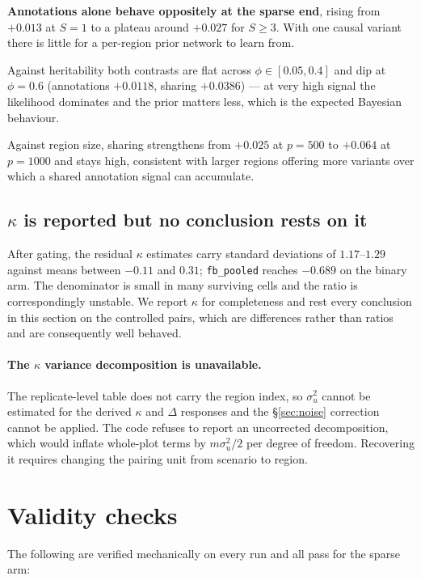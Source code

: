 \documentclass[11pt,a4paper]{article}
\begin{document}
\textbf{Annotations alone behave oppositely at the sparse end}, rising from
$+0.013$ at $S=1$ to a plateau around $+0.027$ for $S\ge3$. With one causal
variant there is little for a per-region prior network to learn from.

Against heritability both contrasts are flat across $\phi\in[0.05,0.4]$ and dip
at $\phi=0.6$ (annotations $+0.0118$, sharing $+0.0386$) --- at very high signal
the likelihood dominates and the prior matters less, which is the expected
Bayesian behaviour.

Against region size, sharing strengthens from $+0.025$ at $p=500$ to $+0.064$ at
$p=1000$ and stays high, consistent with larger regions offering more variants
over which a shared annotation signal can accumulate.

\subsection{$\kappa$ is reported but no conclusion rests on it}

After gating, the residual $\kappa$ estimates carry standard deviations of
$1.17$--$1.29$ against means between $-0.11$ and $0.31$; \texttt{fb\_pooled}
reaches $-0.689$ on the binary arm. The denominator is small in many surviving
cells and the ratio is correspondingly unstable. We report $\kappa$ for
completeness and rest every conclusion in this section on the controlled pairs,
which are differences rather than ratios and are consequently well behaved.

\paragraph{The $\kappa$ variance decomposition is unavailable.} The
replicate-level table does not carry the region index, so $\sigma^2_u$ cannot be
estimated for the derived $\kappa$ and $\Delta$ responses and the \S\ref{sec:noise}
correction cannot be applied. The code refuses to report an uncorrected
decomposition, which would inflate whole-plot terms by $m\sigma^2_u/2$ per
degree of freedom. Recovering it requires changing the pairing unit from
scenario to region.

\section{Validity checks}\label{sec:validity}

The following are verified mechanically on every run and all pass for the sparse
arm:
\end{document}

